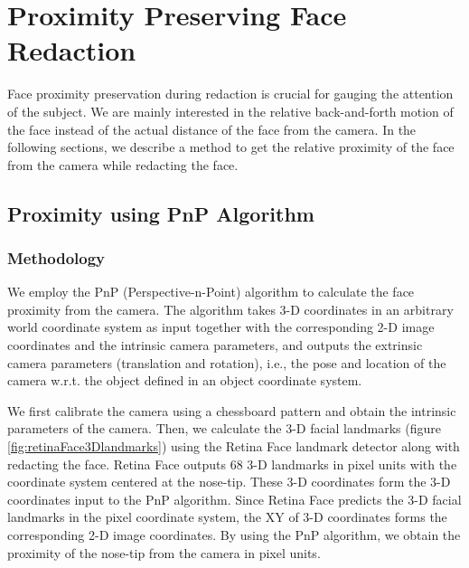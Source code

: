 \chapter{Proximity Preserving Face Redaction}

Face proximity preservation during redaction is crucial for gauging the attention of the subject. We are mainly interested in the relative back-and-forth motion of the face instead of the actual distance of the face from the camera. In the following sections, we describe a method to get the relative proximity of the face from the camera while redacting the face.


\section{Proximity using PnP Algorithm}


\subsection{Methodology}
We employ the PnP (Perspective-n-Point) algorithm to calculate the face proximity from the camera. The algorithm takes 3-D coordinates in an arbitrary world coordinate system as input together with the corresponding 2-D image coordinates and the intrinsic camera parameters, and outputs the extrinsic camera parameters (translation and rotation), i.e., the pose and location of the camera w.r.t. the object defined in an object coordinate system.

We first calibrate the camera using a chessboard pattern and obtain the intrinsic parameters of the camera. Then, we calculate the 3-D facial landmarks (figure \ref{fig:retinaFace3Dlandmarks}) using the Retina Face landmark detector along with redacting the face. Retina Face outputs 68 3-D landmarks in pixel units with the coordinate system centered at the nose-tip. These 3-D coordinates form the 3-D coordinates input to the PnP algorithm. Since Retina Face predicts the 3-D facial landmarks in the pixel coordinate system, the XY of 3-D coordinates forms the corresponding 2-D image coordinates. By using the PnP algorithm, we obtain the proximity of the nose-tip from the camera in pixel units.

